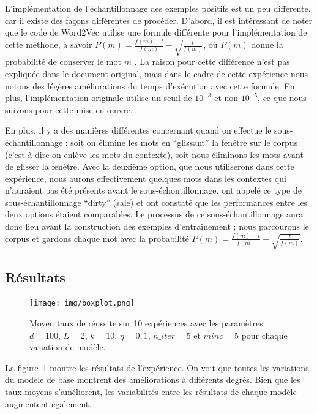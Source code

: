 \documentclass[12pt]{article}
\begin{document}
L'implémentation de l'échantillonnage des exemples positifs est un peu différente, car il existe des façons différentes de procéder. D'abord, il est intéressant de noter que le code de Word2Vec utilise une formule différente pour l'implémentation de cette méthode, à savoir $ P(m) = \frac{f(m)-t}{f(m)} - \sqrt{\frac{t}{f(m)}} $, où $P(m)$ donne la probabilité de conserver le mot $m$ \citep{word2vec_source}. La raison pour cette différence n'est pas expliquée dans le document original, mais dans le cadre de cette expérience nous notons des légères améliorations du temps d'exécution avec cette formule. En plus, l'implémentation originale utilise un seuil de $10^{-3}$ et non $10^{-5}$, ce que nous suivons pour cette mise en œuvre.

En plus, il y a des manières différentes concernant quand on effectue le sous-échantillonnage : soit on élimine les mots en ``glissant'' la fenêtre sur le corpus (c'est-à-dire on enlève les mots du contexte), soit nous éliminons les mots avant de glisser la fenêtre. Avec la deuxième option, que nous utiliserons dans cette expérience, nous aurons effectivement quelques mots dans les contextes qui n'auraient pas été présents avant le sous-échontillonnage. \cite{levy2015improving} ont appelé ce type de sous-échantillonnage ``dirty'' (sale) et ont constaté que les performances entre les deux options étaient comparables. Le processus de ce sous-échantillonnage aura donc lieu avant la construction des exemples d'entraînement ; nous parcourons le corpus et gardons chaque mot avec la probabilité $ P(m) = \frac{f(m)-t}{f(m)} - \sqrt{\frac{t}{f(m)}} $.

\subsection{Résultats} \label{résultats-1}

\begin{figure}[htpb]
    \centering
    \texttt{[image: img/boxplot.png]}
    \caption{Moyen taux de réussite sur 10 expériences avec les paramètres $d=100$, $L=2$, $k=10$, $\eta=0{,}1$, $n\_ iter=5$ et $minc=5$ pour chaque variation de modèle.}
    \label{fig:boxplot}
\end{figure}

La figure~\ref{fig:boxplot} montre les résultats de l'expérience. On voit que toutes les variations du modèle de base montrent des améliorations à différents degrés. Bien que les taux moyens s'améliorent, les variabilités entre les résultats de chaque modèle augmentent également. 
\end{document}
